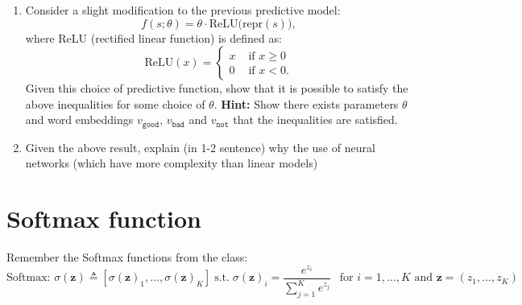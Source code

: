 \begin{enumerate}
    \item  Consider a slight modification to the previous predictive model: 
        $$ 
            f(s; \theta) = \theta \cdot \text{ReLU}\big( \text{repr}(s) \big), 
        $$
        where ReLU (rectified linear function) is defined as: 
        $$
            \text{ReLU}(x) = 
            \begin{cases}
                x & \text{ if } x \geq 0  \\ 
                0 & \text{ if } x < 0.
            \end{cases}
        $$
        Given this choice of predictive function, show that it is possible to satisfy the above inequalities for some choice of $\theta$. 
        \textbf{Hint:} Show there exists parameters $\theta$ and word embeddings $v_\texttt{good}$, $v_\texttt{bad}$ and $v_\texttt{not}$ that the inequalities are satisfied. \\ 

\item Given the above result, explain (in 1-2 sentence) why the use of neural networks (which have more complexity than linear models)
    \\
\end{enumerate}



\section{Softmax function}
\label{sec:softmax}
Remember  the Softmax functions from the class: 
$$
    \text{Softmax: } \sigma(\mathbf{z}) \triangleq [\sigma(\mathbf{z})_1, \hdots, \sigma(\mathbf{z})_K] \; \text{s.t.} \;  \sigma(\mathbf{z})_i = \frac{e^{z_i}}{\sum_{j=1}^K e^{z_j}} \ \ \text{ for } i = 1, \dotsc, K \text{ and } \mathbf{z} = (z_1, \dotsc, z_K)
$$

